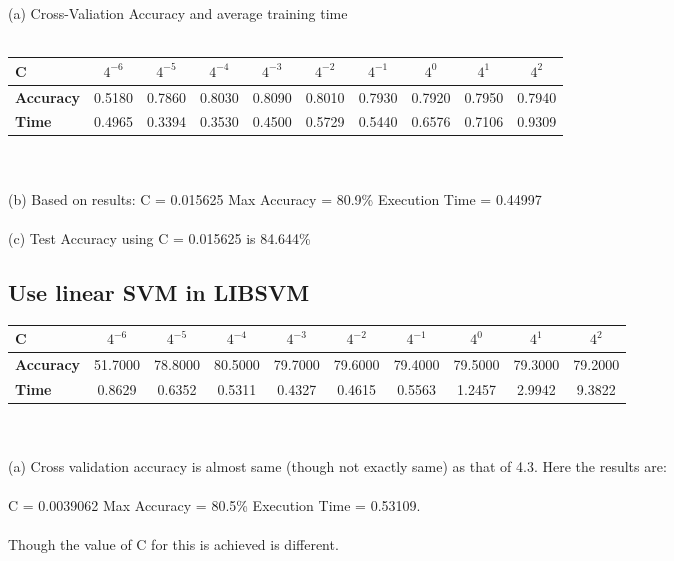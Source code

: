 \documentclass[paper=a4, fontsize=11pt]{scrartcl} %
\numberwithin{equation}{section} %
\numberwithin{figure}{section} %
\numberwithin{table}{section} %
\begin{document}
(a) Cross-Valiation Accuracy and average training time\\\\

\begin{tabular}{l*{9}{c}}
\textbf{C} & $4^{-6}$ & $4^{-5}$ & $4^{-4}$ & $4^{-3}$ & $4^{-2}$ & $4^{-1}$ & $4^{0}$ & $4^{1}$ & $4^{2}$ \\
\hline
\textbf{Accuracy} & 0.5180 & 0.7860 &    0.8030 &    0.8090 &    0.8010 &    0.7930 &   0.7920 &    0.7950 &    0.7940\\
\textbf{Time} & 0.4965 &    0.3394 &    0.3530 &    0.4500 & 0.5729 &    0.5440 &    0.6576 &    0.7106 &    0.9309
\end{tabular}\\\\

(b) Based on results: C = 0.015625 Max Accuracy = 80.9\% Execution Time = 0.44997\\\\

(c) Test Accuracy using C = 0.015625 is 84.644\%


\subsection{Use linear SVM in LIBSVM}

\begin{tabular}{l*{9}{c}}
\textbf{C} & $4^{-6}$ & $4^{-5}$ & $4^{-4}$ & $4^{-3}$ & $4^{-2}$ & $4^{-1}$ & $4^{0}$ & $4^{1}$ & $4^{2}$ \\
\hline
\textbf{Accuracy} & 51.7000 &   78.8000 &   80.5000 &   79.7000 &   79.6000 & 79.4000 &   79.5000 &   79.3000 &   79.2000\\
\textbf{Time} & 0.8629 &    0.6352 &    0.5311 &    0.4327 &    0.4615 &    0.5563 &    1.2457 &    2.9942 &    9.3822
\end{tabular}\\\\

(a) Cross validation accuracy is almost same (though not exactly same) as that of 4.3. Here the results are: \\\\
C = 0.0039062 Max Accuracy = 80.5\% Execution Time = 0.53109.\\\\
Though the value of C for this is achieved is different.\\\\
\end{document}
